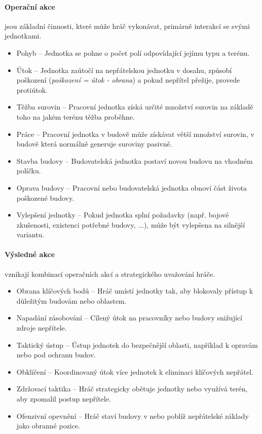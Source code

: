\paragraph{Operační akce} jsou základní činnosti, které může hráč vykonávat, primárně interakcí se svými jednotkami.
\begin{itemize}
    \item Pohyb -- Jednotka se pohne o počet polí odpovídající jejímu typu a terénu.
    \item Útok -- Jednotka zaútočí na nepřátelskou jednotku v dosahu, způsobí poškození (\textit{poškození = útok - obrana}) a pokud nepřítel přežije, provede protiútok.
    \item Těžba surovin -- Pracovní jednotka získá určité množství surovin na základě toho na jakém terénu těžba proběhne.
    \item Práce -- Pracovní jednotka v budově může získávat větší množství surovin, v budově která normálně generuje suroviny pasivně.
    \item Stavba budovy -- Budovatelská jednotka postaví novou budovu na vhodném políčku.
    \item Oprava budovy -- Pracovní nebo budovatelská jednotka obnoví část života poškozené budovy.
    \item Vylepšení jednotky -- Pokud jednotka splní požadavky (např. bojové zkušenosti, existenci potřebné budovy, ...), může být vylepšena na silnější variantu.
\end{itemize}

\paragraph{Výsledné akce} vznikají kombinací operačních akcí a strategického uvažování hráče.
\begin{itemize}
    \item Obrana klíčových bodů -- Hráč umístí jednotky tak, aby blokovaly přístup k důležitým budovám nebo oblastem.
    \item Napadání zásobování -- Cílený útok na pracovníky nebo budovy snižující zdroje nepřítele.
    \item Taktický ústup -- Ústup jednotek do bezpečnější oblasti, například k opravám nebo pod ochranu budov.
    \item Obklíčení -- Koordinovaný útok více jednotek k eliminaci klíčových nepřátel.
    \item Zdržovací taktika -- Hráč strategicky obětuje jednotky nebo využívá terén, aby zpomalil postup nepřítele.
    \item Ofenzivní opevnění -- Hráč staví budovy v nebo poblíž nepřátelské základy jako obranné pozice.
\end{itemize}


